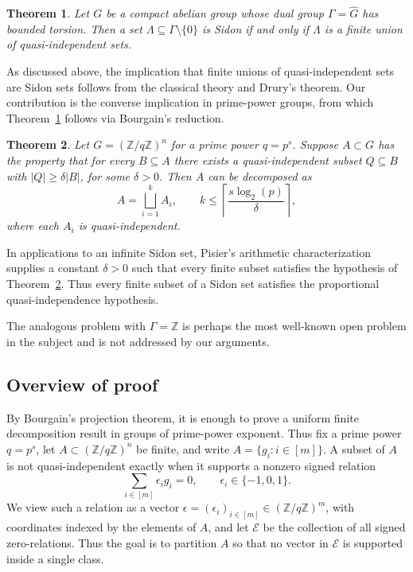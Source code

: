 \documentclass[11pt]{amsart}
\newtheorem{theorem}{Theorem}[section]
\newcommand{\Z}{\mathbb{Z}}
\begin{document}
\begin{theorem}\label{thm:main}
Let \(G\) be a compact abelian group whose dual group \(\Gamma=\widehat G\) has bounded torsion. Then a set \(\Lambda\subseteq\Gamma\setminus\{0\}\) is Sidon if and only if \(\Lambda\) is a finite union of quasi-independent sets.
\end{theorem}

As discussed above, the implication that finite unions of quasi-independent sets are Sidon sets follows from the classical theory and Drury's theorem. Our contribution is the converse implication in prime-power groups, from which Theorem~\ref{thm:main} follows via Bourgain's reduction.

\begin{theorem}\label{thm:reduced}
Let \(G=(\Z/q\Z)^n\) for a prime power \(q=p^s\). Suppose \(A\subset G\) has the property that for every \(B\subseteq A\) there exists a quasi-independent subset \(Q\subseteq B\) with \(|Q|\geq \delta |B|\), for some \(\delta >0 \). Then \(A\) can be decomposed as
$$
        A=\bigsqcup_{i=1}^k A_i,
        \qquad
        k\leq \left\lceil \frac{s\log_2(p)}{\delta}\right\rceil,
$$
where each \(A_i\) is quasi-independent.
\end{theorem}

In applications to an infinite Sidon set, Pisier's arithmetic characterization supplies a constant \(\delta>0\) such that every finite subset satisfies the hypothesis of Theorem~\ref{thm:reduced}. Thus every finite subset of a Sidon set satisfies the proportional quasi-independence hypothesis.

The analogous problem with \(\Gamma=\Z\) is perhaps the most well-known open problem in the subject and is not addressed by our arguments.

\subsection{Overview of proof}
By Bourgain's projection theorem, it is enough to prove a uniform finite decomposition result in groups of prime-power exponent. Thus fix a prime power \(q=p^s\), let \(A\subset(\Z/q\Z)^n\) be finite, and write \(A=\{g_i:i\in[m]\}\). A subset of \(A\) is not quasi-independent exactly when it supports a nonzero signed relation
$$
        \sum_{i\in[m]}\epsilon_i g_i=0,
        \qquad
        \epsilon_i\in\{-1,0,1\}.
$$
We view such a relation as a vector \(\epsilon=(\epsilon_i)_{i\in[m]}\in(\Z/q\Z)^m\), with coordinates indexed by the elements of \(A\), and let \(\mathcal E\) be the collection of all signed zero-relations. Thus the goal is to partition \(A\) so that no vector in \(\mathcal E\) is supported inside a single class.
\end{document}
